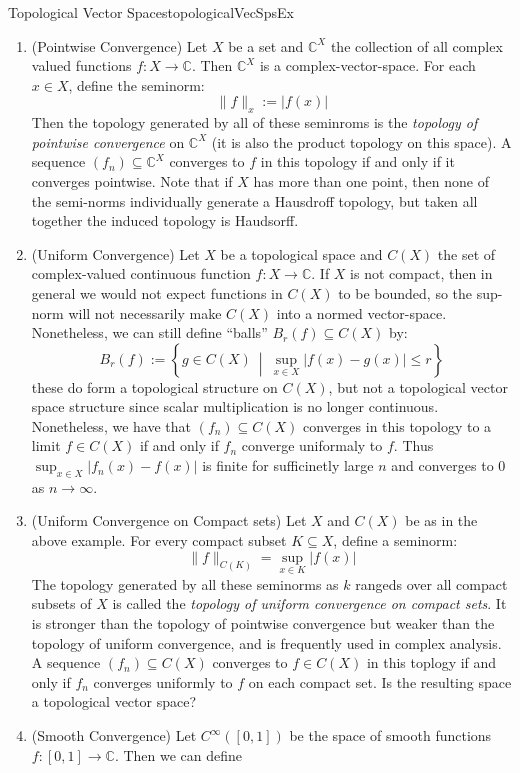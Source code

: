 \documentclass[oneside]{book}
\newcommand{\C}{\mathbb{C}}
\newcommand{\sse}{\subseteq}
\newcommand{\set}[2]{\left\{#1 \ \middle|\ #2\right\}}
\begin{document}
\begin{example}{Topological Vector Spaces}{topologicalVecSpsEx}
\begin{enumerate}
\[			\]
			for all $x \in V$.
		\item (Pointwise Convergence) Let $X$ be a set and $\C^X$ the collection of all complex valued functions $f: X \to \C$. Then
			$\C^X$ is a complex-vector-space. For each $x \in X$, define the seminorm:
			\[
				\|f\|_x := |f(x)|
			\]
			Then the topology generated by all of these seminroms is the \emph{topology of
			pointwise convergence} on $\C^X$ (it is also the product topology on this space). A sequence
			$(f_n) \sse \C^X$ converges to $f$ in this topology if and only if it converges pointwise. Note
			that if $X$ has more than one point, then none of the semi-norms individually generate
			a Hausdroff topology, but taken all together the induced topology is Haudsorff.
		\item (Uniform Convergence) Let $X$ be a topological space and $C(X)$ the set of complex-valued continuous function $f: X \to
			\C$. If $X$ is not compact, then in general we would not expect functions in $C(X)$ to be
			bounded, so the sup-norm will not necessarily make $C(X)$ into a normed vector-space.
			Nonetheless, we can still define ``balls'' $B_r(f) \sse C(X)$ by:
			\[
				B_r(f) := \set{g \in C(X)}{\sup_{x \in X}|f(x) - g(x)| \le r}
			\]
			these do form a topological structure on $C(X)$, but not a topological vector space structure
			since scalar multiplication is no longer continuous. Nonetheless, we have that $(f_n) \sse C(X)$
			converges in this topology to a limit $f \in C(X)$ if and only if $f_n$ converge uniformaly to
			$f$. Thus $\sup_{x \in X}|f_n(x) - f(x)|$ is finite for sufficinetly large $n$ and converges to
			$0$ as $ n \to \infty$.
		\item (Uniform Convergence on Compact sets) Let $X$ and $C(X)$ be as in the above example. For every compact subset $K \sse X$, define
			a seminorm:
			\[
				\|f\|_{C(K)} = \sup_{x \in K} |f(x)|
			\]
			The topology generated by all these seminorms as $k$ rangeds over all compact subsets of $X$ is called the
			\emph{topology of uniform convergence on compact sets}. It is stronger than the topology of pointwise
			convergence but weaker than the topology of uniform convergence, and is frequently used in complex analysis.
			A sequence $(f_n) \sse C(X)$ converges to $f \in C(X)$ in this toplogy if and only if $f_n$ converges
			uniformly to $f$ on each compact set. Is the resulting space a topological vector space?
		\item (Smooth Convergence) Let $C^\infty([0,1])$ be the space of smooth functions $f: [0,1] \to \C$. Then we can define

\end{enumerate}
\end{example}
\end{document}

